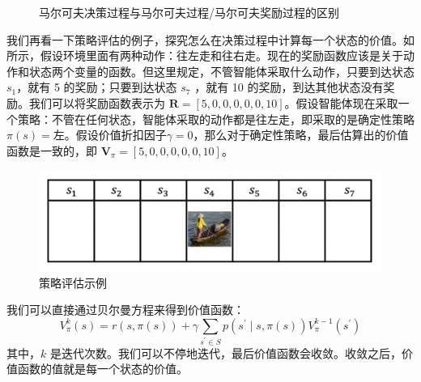 \begin{figure}[h]
  \centering
  \caption{马尔可夫决策过程与马尔可夫过程/马尔可夫奖励过程的区别}
  \label{fig:MDP_example}
\end{figure}

我们再看一下策略评估的例子，探究怎么在决策过程中计算每一个状态的价值。如 所示，假设环境里面有两种动作：往左走和往右走。现在的奖励函数应该是关于动作和状态两个变量的函数。但这里规定，不管智能体采取什么动作，只要到达状态 $s_1$，就有 5 的奖励；只要到达状态 $s_7$ ，就有 10 的奖励，到达其他状态没有奖励。我们可以将奖励函数表示为 $\boldsymbol{R}=[5,0,0,0,0,0,10]$。假设智能体现在采取一个策略：不管在任何状态，智能体采取的动作都是往左走，即采取的是确定性策略 $\pi(s)=\text{左}$。假设价值折扣因子$\gamma=0$，那么对于确定性策略，最后估算出的价值函数是一致的，即 $\boldsymbol{V}_{\pi}=[5,0,0,0,0,0,10]$。

\begin{figure}[hbt]
  \centering
  \includegraphics[width=0.5\linewidth]{res/ch2/2.29}
  \caption{策略评估示例}
  \label{fig:fig2.29}
\end{figure}

我们可以直接通过贝尔曼方程来得到价值函数：
\begin{equation}
  V^{k}_{\pi}(s)=r(s, \pi(s))+\gamma \sum_{s^{\prime} \in S} p\left(s^{\prime} \mid s, \pi(s)\right) V^{k-1}_{\pi}\left(s^{\prime}\right)
  \label{eq:iteration_value}
\end{equation}
其中，$k$ 是迭代次数。我们可以不停地迭代，最后价值函数会收敛。收敛之后，价值函数的值就是每一个状态的价值。

